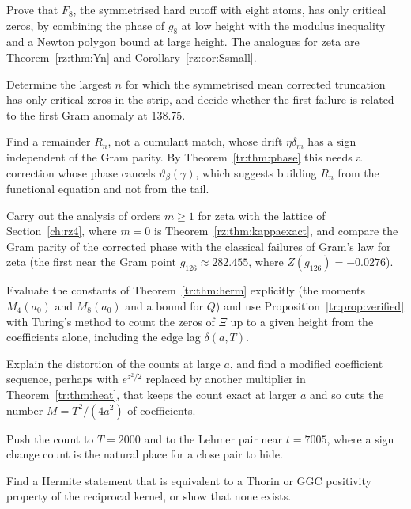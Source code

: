 \begin{problem}\label{tr:prob:F8}
Prove that $F_8$, the symmetrised hard cutoff with eight atoms, has only critical zeros, by combining the phase of $g_8$ at low height with the modulus inequality and a Newton polygon bound at large height. The analogues for zeta are Theorem~\ref{rz:thm:Yn} and Corollary~\ref{rz:cor:Ssmall}.
\end{problem}

\begin{problem}\label{tr:prob:largest}
Determine the largest $n$ for which the symmetrised mean corrected truncation has only critical zeros in the strip, and decide whether the first failure is related to the first Gram anomaly at $138.75$.
\end{problem}

\begin{problem}\label{tr:prob:remainder}
Find a remainder $R_n$, not a cumulant match, whose drift $\eta\delta_m$ has a sign independent of the Gram parity. By Theorem~\ref{tr:thm:phase} this needs a correction whose phase cancels $\vartheta_\beta(\gamma)$, which suggests building $R_n$ from the functional equation and not from the tail.
\end{problem}

\begin{problem}\label{tr:prob:zeta}
Carry out the analysis of orders $m\ge1$ for zeta with the lattice of Section~\ref{ch:rz4}, where $m=0$ is Theorem~\ref{rz:thm:kappaexact}, and compare the Gram parity of the corrected phase with the classical failures of Gram's law for zeta (the first near the Gram point $g_{126}\approx282.455$, where $Z(g_{126})=-0.0276$).
\end{problem}

\begin{problem}\label{tr:prob:explicit}
Evaluate the constants of Theorem~\ref{tr:thm:herm} explicitly (the moments $M_4(a_0)$ and $M_8(a_0)$ and a bound for $Q$) and use Proposition~\ref{tr:prop:verified} with Turing's method to count the zeros of $\Xi$ up to a given height from the coefficients alone, including the edge lag $\delta(a,T)$.
\end{problem}

\begin{problem}\label{tr:prob:amp}
Explain the distortion of the counts at large $a$, and find a modified coefficient sequence, perhaps with $e^{z^2/2}$ replaced by another multiplier in Theorem~\ref{tr:thm:heat}, that keeps the count exact at larger $a$ and so cuts the number $M=T^2/(4a^2)$ of coefficients.
\end{problem}

\begin{problem}\label{tr:prob:lehmer}
Push the count to $T=2000$ and to the Lehmer pair near $t=7005$, where a sign change count is the natural place for a close pair to hide.
\end{problem}

\begin{problem}\label{tr:prob:shadow}
Find a Hermite statement that is equivalent to a Thorin or GGC positivity property of the reciprocal kernel, or show that none exists.
\end{problem}

